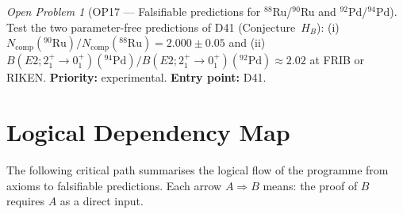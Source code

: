 \documentclass[11pt,a4paper]{article}
\theoremstyle{plain}
\theoremstyle{definition}
\theoremstyle{remark}
\newtheorem{openproblem}[theorem]{Open Problem}
\begin{document}
\begin{openproblem}[OP17 --- Falsifiable predictions for $^{88}$Ru/$^{90}$Ru and $^{92}$Pd/$^{94}$Pd]
\label{op:FRIB}
Test the two parameter-free predictions of D41 (Conjecture~$H_B$): (i) $N_{\mathrm{comp}}(^{90}\mathrm{Ru})/N_{\mathrm{comp}}(^{88}\mathrm{Ru})=2.000\pm0.05$ and (ii) $B(E2;2^+_1\!\to\!0^+_1)(^{94}\mathrm{Pd})/B(E2;2^+_1\!\to\!0^+_1)(^{92}\mathrm{Pd})\approx 2.02$ at FRIB or RIKEN. \textbf{Priority:} experimental. \textbf{Entry point:} D41.
\end{openproblem}

\newpage
\section{Logical Dependency Map}
\label{sec:dependency}

The following critical path summarises the logical flow of the programme from axioms to falsifiable predictions. Each arrow $A\Rightarrow B$ means: the proof of $B$ requires $A$ as a direct input.
\end{document}
